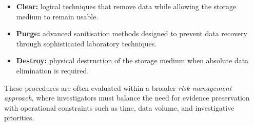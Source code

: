\medskip

\begin{itemize}
\item \textbf{Clear:} logical techniques that remove data while allowing the storage medium to remain usable.
\item \textbf{Purge:} advanced sanitisation methods designed to prevent data recovery through sophisticated laboratory techniques.
\item \textbf{Destroy:} physical destruction of the storage medium when absolute data elimination is required.
\end{itemize}

\medskip

\noindent
These procedures are often evaluated within a broader \textit{risk management approach}, where investigators must balance the need for evidence preservation with operational constraints such as time, data volume, and investigative priorities.



